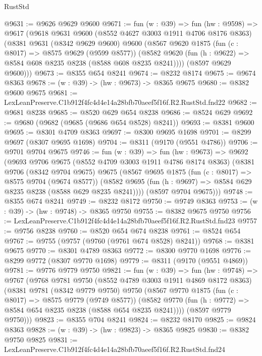 \begin{lexlean}{RustStd}
\begin{coremodule}
@9631 := @9626 @9629 @9600
@9671 := fun (w : @39) =>
  fun (hw : @9598) =>
  @9617
    (@9618
      @9631
      @9600
      (@8552 @4627 @3003 @1911 @4706 @8176 @8363)
      (@8381
        @9631
        (@8342 @9629 @9600)
        @9600
        (@8567
          @9620
          @1875
          (fun (c : @8017) => @8575 @9629 (@9599 @8577))
          (@8582 @9620 (fun (h : @9622) => @8584 @608 @8235 @8238 (@8588 @608 @8235 @8241))))
        (@8597 @9629 @9600)))
@9673 := @8355 @654 @8241
@9674 := @8232 @8174
@9675 := @9674 @8363
@9678 := (w : @39) -> (hw : @9673) -> @8365 @9675
@9680 := @8382 @9600 @9675
@9681 := LexLeanPreserve.C1b912f4fc4d4e14a28bfb70aeef5f16f.R2.RustStd.fnd22
@9682 := @9681 @8238
@9685 := @8520 @629 @654 @8238
@9686 := @8524 @629
@9692 := @9680 (@9682 (@9685 (@9686 @654 @8528) @8241))
@9693 := @8381 @9600
@9695 := @8301 @4709 @8363
@9697 := @8300 @9695 @1698
@9701 := @8299 @9697 (@8307 @9695 @1698)
@9704 := @8311 (@9170 (@9551 @4786))
@9706 := @9701 @9704 @9675
@9746 := fun (w : @39) =>
  fun (hw : @9673) =>
  @9692
    (@9693
      @9706
      @9675
      (@8552 @4709 @3003 @1911 @4786 @8174 @8363)
      (@8381
        @9706
        (@8342 @9704 @9675)
        @9675
        (@8567
          @9695
          @1875
          (fun (c : @8017) => @8575 @9704 (@9674 @8577))
          (@8582 @9695 (fun (h : @9697) => @8584 @629 @8235 @8238 (@8588 @629 @8235 @8241))))
        (@8597 @9704 @9675)))
@9748 := @8355 @674 @8241
@9749 := @8232 @8172
@9750 := @9749 @8363
@9753 := (w : @39) -> (hw : @9748) -> @8365 @9750
@9755 := @8382 @9675 @9750
@9756 := LexLeanPreserve.C1b912f4fc4d4e14a28bfb70aeef5f16f.R2.RustStd.fnd23
@9757 := @9756 @8238
@9760 := @8520 @654 @674 @8238
@9761 := @8524 @654
@9767 := @9755 (@9757 (@9760 (@9761 @674 @8528) @8241))
@9768 := @8381 @9675
@9770 := @8301 @4789 @8363
@9772 := @8300 @9770 @1698
@9776 := @8299 @9772 (@8307 @9770 @1698)
@9779 := @8311 (@9170 (@9551 @4869))
@9781 := @9776 @9779 @9750
@9821 := fun (w : @39) =>
  fun (hw : @9748) =>
  @9767
    (@9768
      @9781
      @9750
      (@8552 @4789 @3003 @1911 @4869 @8172 @8363)
      (@8381
        @9781
        (@8342 @9779 @9750)
        @9750
        (@8567
          @9770
          @1875
          (fun (c : @8017) => @8575 @9779 (@9749 @8577))
          (@8582 @9770 (fun (h : @9772) => @8584 @654 @8235 @8238 (@8588 @654 @8235 @8241))))
        (@8597 @9779 @9750)))
@9823 := @8355 @704 @8241
@9824 := @8232 @8170
@9825 := @9824 @8363
@9828 := (w : @39) -> (hw : @9823) -> @8365 @9825
@9830 := @8382 @9750 @9825
@9831 := LexLeanPreserve.C1b912f4fc4d4e14a28bfb70aeef5f16f.R2.RustStd.fnd24

\end{coremodule}
\end{lexlean}
